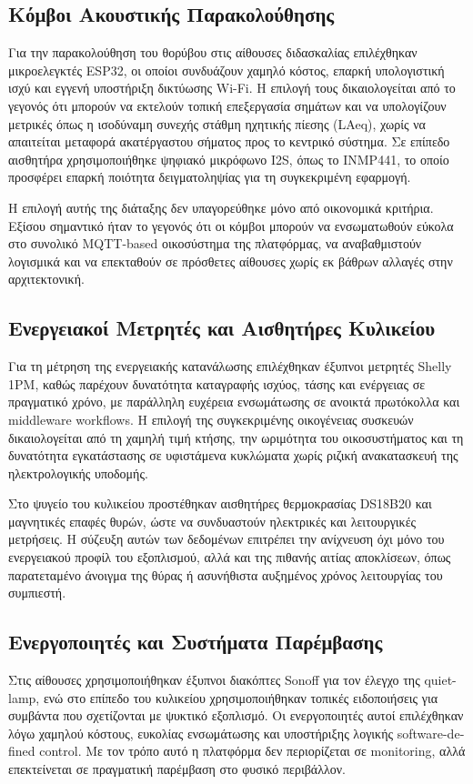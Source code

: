 \subsection{Κόμβοι Ακουστικής Παρακολούθησης}
Για την παρακολούθηση του θορύβου στις αίθουσες διδασκαλίας επιλέχθηκαν μικροελεγκτές \textlatin{ESP32}, οι οποίοι συνδυάζουν χαμηλό κόστος, επαρκή υπολογιστική ισχύ και εγγενή υποστήριξη δικτύωσης \textlatin{Wi-Fi}. Η επιλογή τους δικαιολογείται από το γεγονός ότι μπορούν να εκτελούν τοπική επεξεργασία σημάτων και να υπολογίζουν μετρικές όπως η ισοδύναμη συνεχής στάθμη ηχητικής πίεσης (\textlatin{LAeq}), χωρίς να απαιτείται μεταφορά ακατέργαστου σήματος προς το κεντρικό σύστημα. Σε επίπεδο αισθητήρα χρησιμοποιήθηκε ψηφιακό μικρόφωνο \textlatin{I2S}, όπως το \textlatin{INMP441}, το οποίο προσφέρει επαρκή ποιότητα δειγματοληψίας για τη συγκεκριμένη εφαρμογή.

Η επιλογή αυτής της διάταξης δεν υπαγορεύθηκε μόνο από οικονομικά κριτήρια. Εξίσου σημαντικό ήταν το γεγονός ότι οι κόμβοι μπορούν να ενσωματωθούν εύκολα στο συνολικό \textlatin{MQTT-based} οικοσύστημα της πλατφόρμας, να αναβαθμιστούν λογισμικά και να επεκταθούν σε πρόσθετες αίθουσες χωρίς εκ βάθρων αλλαγές στην αρχιτεκτονική.

\subsection{Ενεργειακοί Μετρητές και Αισθητήρες Κυλικείου}
Για τη μέτρηση της ενεργειακής κατανάλωσης επιλέχθηκαν έξυπνοι μετρητές \textlatin{Shelly 1PM}, καθώς παρέχουν δυνατότητα καταγραφής ισχύος, τάσης και ενέργειας σε πραγματικό χρόνο, με παράλληλη ευχέρεια ενσωμάτωσης σε ανοικτά πρωτόκολλα και \textlatin{middleware workflows}. Η επιλογή της συγκεκριμένης οικογένειας συσκευών δικαιολογείται από τη χαμηλή τιμή κτήσης, την ωριμότητα του οικοσυστήματος και τη δυνατότητα εγκατάστασης σε υφιστάμενα κυκλώματα χωρίς ριζική ανακατασκευή της ηλεκτρολογικής υποδομής.

Στο ψυγείο του κυλικείου προστέθηκαν αισθητήρες θερμοκρασίας \textlatin{DS18B20} και μαγνητικές επαφές θυρών, ώστε να συνδυαστούν ηλεκτρικές και λειτουργικές μετρήσεις. Η σύζευξη αυτών των δεδομένων επιτρέπει την ανίχνευση όχι μόνο του ενεργειακού προφίλ του εξοπλισμού, αλλά και της πιθανής αιτίας αποκλίσεων, όπως παρατεταμένο άνοιγμα της θύρας ή ασυνήθιστα αυξημένος χρόνος λειτουργίας του συμπιεστή.

\subsection{Ενεργοποιητές και Συστήματα Παρέμβασης}
Στις αίθουσες χρησιμοποιήθηκαν έξυπνοι διακόπτες \textlatin{Sonoff} για τον έλεγχο της \textlatin{quiet-lamp}, ενώ στο επίπεδο του κυλικείου χρησιμοποιήθηκαν τοπικές ειδοποιήσεις για συμβάντα που σχετίζονται με ψυκτικό εξοπλισμό. Οι ενεργοποιητές αυτοί επιλέχθηκαν λόγω χαμηλού κόστους, ευκολίας ενσωμάτωσης και υποστήριξης λογικής \textlatin{software-defined control}. Με τον τρόπο αυτό η πλατφόρμα δεν περιορίζεται σε \textlatin{monitoring}, αλλά επεκτείνεται σε πραγματική παρέμβαση στο φυσικό περιβάλλον.

